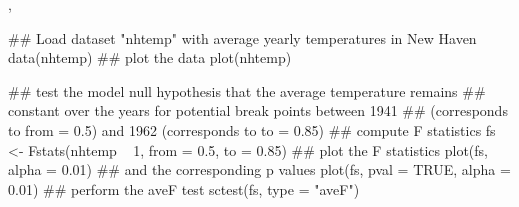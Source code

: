 \begin{SeeAlso}\relax
{}, \end{SeeAlso}
\begin{Examples}
\begin{ExampleCode}
## Load dataset "nhtemp" with average yearly temperatures in New Haven
data(nhtemp)
## plot the data
plot(nhtemp)

## test the model null hypothesis that the average temperature remains
## constant over the years for potential break points between 1941
## (corresponds to from = 0.5) and 1962 (corresponds to to = 0.85)
## compute F statistics
fs <- Fstats(nhtemp ~ 1, from = 0.5, to = 0.85)
## plot the F statistics
plot(fs, alpha = 0.01)
## and the corresponding p values
plot(fs, pval = TRUE, alpha = 0.01)
## perform the aveF test
sctest(fs, type = "aveF")
\end{ExampleCode}
\end{Examples}

